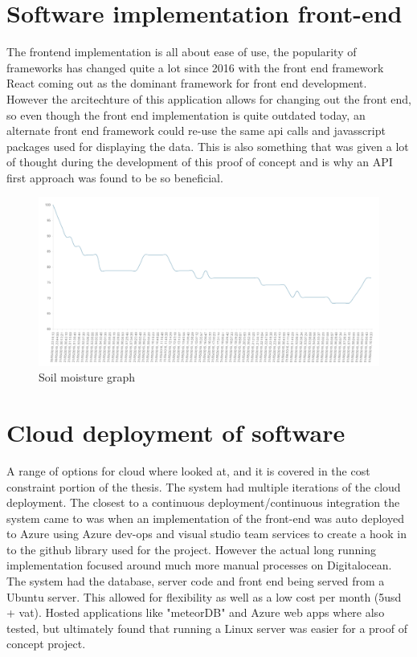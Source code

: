 \documentclass[]{uiophd}
\begin{document}
\section{Software implementation front-end}
The frontend implementation is all about ease of use, the popularity of frameworks has changed quite a lot since 2016 with the front end framework React coming out as the dominant framework for front end development. However the arcitechture of this application allows for changing out the front end, so even though the front end implementation is quite outdated today, an alternate front end framework could re-use the same api calls and javasscript packages used for displaying the data. This is also something that was given a lot of thought during the development of this proof of concept and is why an API first approach was found to be so beneficial. 

 \begin{figure}[h]
\caption{Soil moisture graph}
\centering
\includegraphics[width=12cm]{watergraph.png}
\end{figure}

\section{Cloud deployment of software}
A range of options for cloud where looked at, and it is covered in the cost constraint portion of the thesis. The system had multiple iterations of the cloud deployment. The closest to a continuous deployment/continuous integration the system came to was when an implementation of the front-end was auto deployed to Azure using Azure dev-ops and visual studio team services to create a hook in to the github library used for the project. However the actual long running implementation focused around much more manual processes on Digitalocean. The system had the database, server code and front end being served from a Ubuntu server. This allowed for flexibility as well as a low cost per month (5usd + vat). Hosted applications like "meteorDB" and Azure web apps where also tested, but ultimately found that running a Linux server was easier for a proof of concept project.
\end{document}
